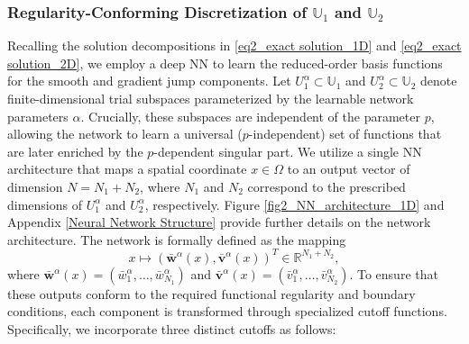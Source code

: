 \documentclass[oneside]{article}
\begin{document}
\subsubsection*{Regularity-Conforming Discretization of $\mathbb{U}_1$ and $\mathbb{U}_2$}
Recalling the solution decompositions in \eqref{eq2_exact solution_1D} and \eqref{eq2_exact solution_2D}, we employ a deep NN to learn the reduced-order basis functions for the smooth and gradient jump components. Let $U_1^\alpha \subset \mathbb{U}_1$ and $U_2^\alpha \subset \mathbb{U}_2$ denote finite-dimensional trial subspaces parameterized by the learnable network parameters $\alpha$. Crucially, these subspaces are independent of the parameter $p$, allowing the network to learn a universal ($p$-independent) set of functions that are later enriched by the $p$-dependent singular part. We utilize a single NN architecture that maps a spatial coordinate $x \in \Omega$ to an output vector of dimension $N = N_1 + N_2$, where $N_1$ and $N_2$ correspond to the prescribed dimensions of $U_1^\alpha$ and $U_2^\alpha$, respectively. Figure \eqref{fig2_NN_architecture_1D} and Appendix \ref{Neural Network Structure} provide further details on the network architecture. The network is formally defined as the mapping
\begin{equation}
x \mapsto \left( \bar{\mathbf{w}}^\alpha(x), \bar{\mathbf{v}}^\alpha(x) \right)^T \in \mathbb{R}^{N_1 + N_2},
\end{equation}
where $\bar{\mathbf{w}}^\alpha(x) = (\bar{w}^\alpha_1, \dots, \bar{w}^\alpha_{N_1})$ and $\bar{\mathbf{v}}^\alpha(x) = (\bar{v}^\alpha_1, \dots, \bar{v}^\alpha_{N_2})$.
To ensure that these outputs conform to the required functional regularity and boundary conditions, each component is transformed through specialized cutoff functions. Specifically, we incorporate three distinct cutoffs as follows:
\end{document}
